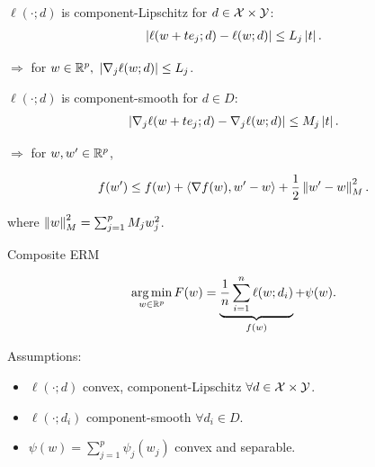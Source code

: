 \documentclass{beamer}
\begin{document}
\begin{frame}
  $\ell(\cdot; d)$ is component-Lipschitz for $d \in \mathcal{X}\times\mathcal{Y}$:
  \begin{align*}
    \left| \ell(w + te_j; d) - \ell(w; d) \right| \le L_j \left| t \right|.
  \end{align*}

  \pause

  \quad $\Rightarrow$ for $w \in \mathbb R^p,$ $\left| \nabla_j \ell(w; d) \right| \le L_j$.

  \vspace{1em}
  \pause



\end{frame}
\begin{frame}

  $\ell(\cdot; d)$ is component-smooth for $d \in D$:
  \begin{align*}
    \left| \nabla_j \ell(w + te_j; d) - \nabla_j \ell(w; d) \right| \le M_j \left| t \right|.
  \end{align*}

  \pause

  \vspace{1em}

  \quad $\Rightarrow$ for $w, w' \in \mathbb R^p$,
  {\Large
    \begin{align*}
      f(w') \le f(w) + \left\langle \nabla f(w), w' - w \right\rangle +
      \frac{1}{2}\left \lVert w'-w \right \rVert_M^2.
    \end{align*}
    \begin{flushright}
      where $\left \lVert w \right \rVert_M^2 = \sum_{j=1}^p M_j w_j^2$.
    \end{flushright}
  }
\end{frame}

\begin{frame}
  \vspace{-0em}
  {\Huge
    \begin{center}
      Composite ERM
    \end{center}
  }
  \vspace{-1.5em}
  \begin{align*}
    \operatorname*{arg\,min}_{w \in \mathbb R^p} F(w) = \underbrace{\frac 1n \sum_{i=1}^n \ell(w; d_i)}_{f(w)} + \psi(w).
  \end{align*}


  Assumptions:

  \vspace{0.5em}

  \begin{itemize}[leftmargin=1em,itemsep=0.5em]
    \Large
  \item $\ell(\cdot; d)$ convex, component-Lipschitz $\forall d\in\mathcal{X}\times\mathcal{Y}$.
  \item $\ell(\cdot; d_i)$ component-smooth $\forall d_i\in D$.
  \item $\psi(w) = \sum_{j=1}^p \psi_j(w_j)$ convex and separable.
  \end{itemize}
\end{frame}
\end{document}

